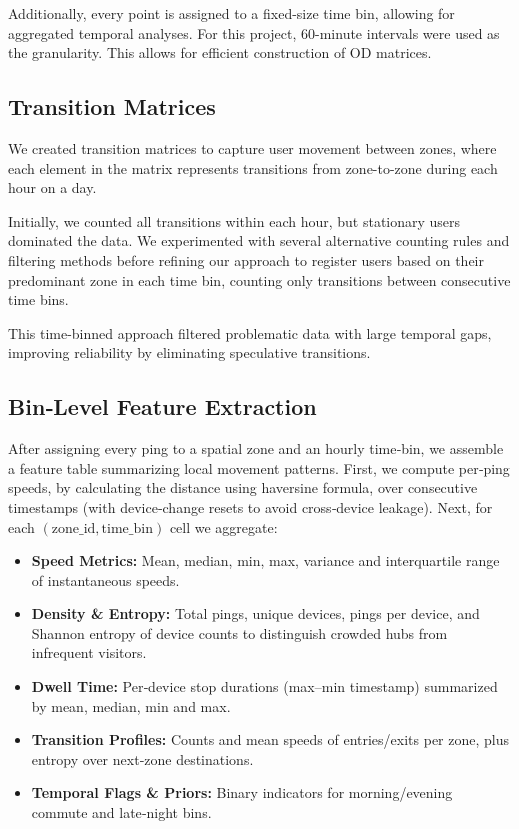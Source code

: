 \documentclass[fleqn,moreauthors,10pt]{ds_report}
\begin{document}
Additionally, every point is assigned to a fixed-size time bin, allowing for aggregated temporal analyses. For this project, 60-minute intervals were used as the granularity. This allows for efficient construction of OD matrices.

\subsection*{Transition Matrices}
We created transition matrices to capture user movement between zones, where each element in the matrix represents transitions from zone-to-zone during each hour on a day.

Initially, we counted all transitions within each hour, but stationary users dominated the data. We experimented with several alternative counting rules and filtering methods before refining our approach to register users based on their predominant zone in each time bin, counting only transitions between consecutive time bins.

This time-binned approach filtered problematic data with large temporal gaps, improving reliability by eliminating speculative transitions.

\subsection*{Bin‐Level Feature Extraction}
\label{sec:binning_insights}

After assigning every ping to a spatial zone and an hourly time‐bin, we assemble a feature table summarizing local movement patterns.  First, we compute per‐ping speeds, by calculating the distance using haversine formula, over consecutive timestamps (with device‐change resets to avoid cross‐device leakage).  Next, for each \((\mathrm{zone\_id},\mathrm{time\_bin})\) cell we aggregate:

\begin{itemize}[nosep]
  \item \textbf{Speed Metrics:} Mean, median, min, max, variance and interquartile range of instantaneous speeds.
  \item \textbf{Density \& Entropy:} Total pings, unique devices, pings per device, and Shannon entropy of device counts to distinguish crowded hubs from infrequent visitors.
  \item \textbf{Dwell Time:} Per‐device stop durations (max–min timestamp) summarized by mean, median, min and max.
  \item \textbf{Transition Profiles:} Counts and mean speeds of entries/exits per zone, plus entropy over next‐zone destinations.
  \item \textbf{Temporal Flags \& Priors:} Binary indicators for morning/evening commute and late‐night bins.
\end{itemize}
\end{document}
